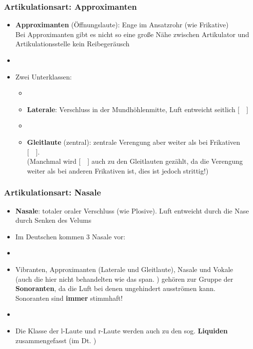 
\begin{frame}
\frametitle{Artikulationsart: Approximanten}

		\begin{itemize}
			\item \textbf{Approximanten} (Öffnungslaute): Enge im Ansatzrohr (wie Frikative)\\
			Bei Approximanten gibt es nicht so eine große Nähe zwischen Artikulator und Artikulationsstelle \ras kein Reibegeräusch
			\item[]
			\item[] Zwei Unterklassen:
			
			\begin{itemize}
				\item[]
				\item \textbf{Laterale}: Verschluss in der Mundhöhlenmitte, Luft entweicht seitlich [~~]
				\item[]
				\item \textbf{Gleitlaute} (zentral): zentrale Verengung aber weiter als bei Frikativen [~~].\\
				(Manchmal wird [~~] auch zu den Gleitlauten gezählt, da die Verengung weiter als bei anderen Frikativen ist, dies ist jedoch strittig!)
			\end{itemize}
			
		\end{itemize}	

\end{frame}



\begin{frame}
\frametitle{Artikulationsart: Nasale}
		\begin{itemize}
			\item \textbf{Nasale}: totaler oraler Verschluss (wie Plosive). Luft entweicht durch die Nase durch Senken des Velums\\
			\item[] Im Deutschen kommen 3 Nasale vor: \textipa{[ m, n, N ]}

		\item[]
		\item Vibranten, Approximanten (Laterale und Gleitlaute), Nasale und Vokale (auch die hier nicht behandelten  wie das span. \textipa{[~R~]}) gehören zur Gruppe der \textbf{Sonoranten}, da die Luft bei denen ungehindert ausströmen kann. Sonoranten sind \textbf{immer} stimmhaft!
		\item[]
		\item Die Klasse der l-Laute und r-Laute werden auch zu den sog. \textbf{Liquiden} zusammengefasst (im Dt. \textipa{[ l, r, \textscr ]})
	\end{itemize}
	
\end{frame}


